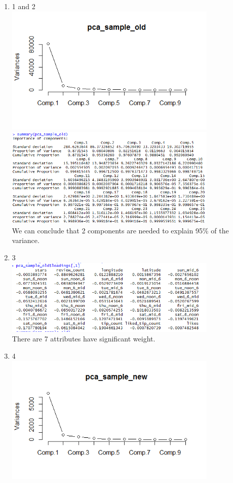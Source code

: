 \documentclass[11pt]{article}
\begin{document}
\begin{enumerate}[(a)]
\begin{enumerate}
\item 
1 and 2\\
\includegraphics[width=4in]{pca_sample_old.png}\\
\includegraphics[width=4in]{c.png}\\
We can conclude that 2 components are needed to explain 95\% of the variance.
\item 3\\
\includegraphics[width=4in]{d.png}\\
There are 7 attributes have significant weight.
\item 4\\
\includegraphics[width=4in]{pca_sample_new.png}\\

\end{enumerate}
\end{enumerate}
\end{document}
